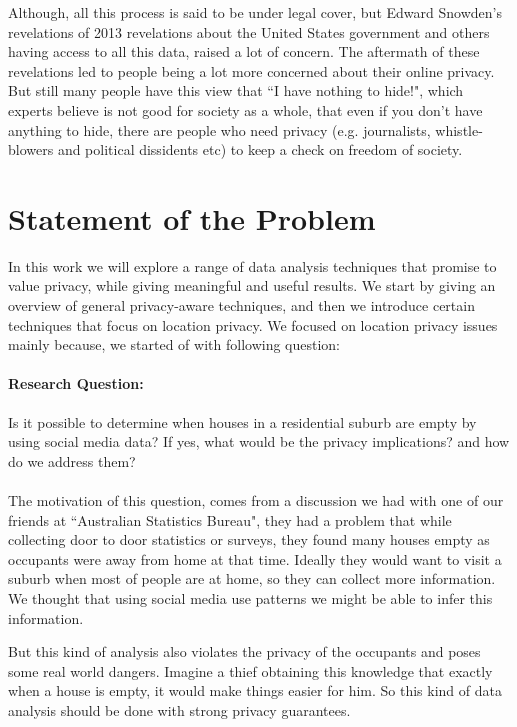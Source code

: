 \documentclass[12pt]{report}
\theoremstyle{named}
\begin{document}
Although, all this process is said to be under legal cover, but Edward Snowden's revelations of 2013\cite{SnowdenStory} revelations about the United States government and others having access to all this data, raised a lot of concern. The aftermath of these revelations led to people being a lot more concerned about their online privacy. But still many people have this view that ``I have nothing to hide!", which experts believe is not good for society as a whole, that even if you don't have anything to hide, there are people who need privacy (e.g. journalists, whistle-blowers and political dissidents etc) to keep a check on freedom of society.


\section{Statement of the Problem}
In this work we will explore a range of data analysis techniques that promise to value privacy, while giving meaningful and useful results. We start by giving an overview of general privacy-aware techniques, and then we introduce certain techniques that focus on location privacy. We focused on location privacy issues mainly because, we started of with following question:

\paragraph{Research Question:} Is it possible to determine when houses in a residential suburb are empty by using social media data? If yes, what would be the privacy implications? and how do we address them?
\paragraph{}
The motivation of this question, comes from a discussion we had with one of our friends at ``Australian Statistics Bureau", they had a problem that while collecting door to door statistics or surveys, they found many houses empty as occupants were away from home at that time. Ideally they would want to visit a suburb when most of people are at home, so they can collect more information. We thought that using social media use patterns we might be able to infer this information. 

But this kind of analysis also violates the privacy of the occupants and poses some real world dangers. Imagine a thief obtaining this knowledge that exactly when a house is empty, it would make things easier for him. So this kind of data analysis should be done with strong privacy guarantees.  
\end{document}
